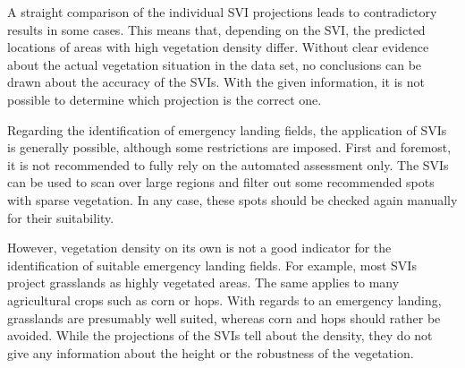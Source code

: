 A straight comparison of the individual SVI projections leads to contradictory results in some cases. This means that, depending on the SVI, the predicted locations of areas with high vegetation density differ. Without clear evidence about the actual vegetation situation in the data set, no conclusions can be drawn about the accuracy of the SVIs. With the given information, it is not possible to determine which projection is the correct one.

Regarding the identification of emergency landing fields, the application of SVIs is generally possible, although some restrictions are imposed. First and foremost, it is not recommended to fully rely on the automated assessment only. The SVIs can be used to scan over large regions and filter out some recommended spots with sparse vegetation. In any case, these spots should be checked again manually for their suitability.

However, vegetation density on its own is not a good indicator for the identification of suitable emergency landing fields. For example, most SVIs project grasslands as highly vegetated areas. The same applies to many agricultural crops such as corn or hops. With regards to an emergency landing, grasslands are presumably well suited, whereas corn and hops should rather be avoided. While the projections of the SVIs tell about the density, they do not give any information about the height or the robustness of the vegetation.

\newpage
